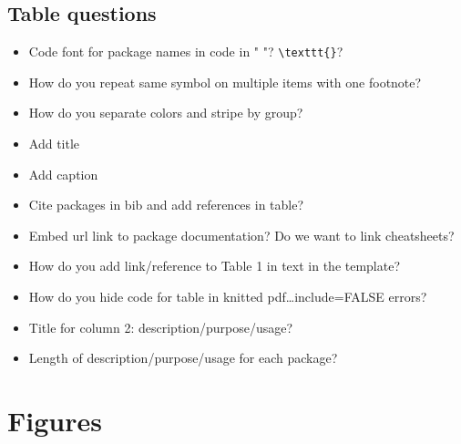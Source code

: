 \documentclass[10pt,letterpaper]{article}
\providecommand{\tightlist}{%
  \setlength{\itemsep}{0pt}\setlength{\parskip}{0pt}}
\begin{document}
\hypertarget{table-questions}{%
\subsection{Table questions}\label{table-questions}}

\begin{itemize}
\tightlist
\item
  Code font for package names in code in " "?
  \texttt{\textbackslash{}texttt\{\}}?
\item
  How do you repeat same symbol on multiple items with one footnote?
\item
  How do you separate colors and stripe by group?
\item
  Add title
\item
  Add caption
\item
  Cite packages in bib and add references in table?
\item
  Embed url link to package documentation? Do we want to link
  cheatsheets?
\item
  How do you add link/reference to Table 1 in text in the template?
\item
  How do you hide code for table in knitted pdf\ldots include=FALSE
  errors?
\item
  Title for column 2: description/purpose/usage?
\item
  Length of description/purpose/usage for each package?
\end{itemize}

\hypertarget{figures}{%
\section{Figures}\label{figures}}
\end{document}
